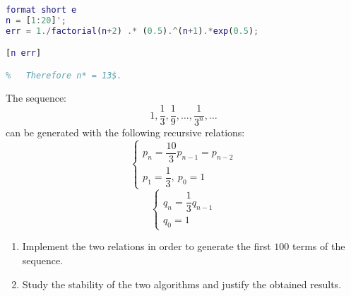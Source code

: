 \documentclass[12pt, a4paper]{report}
\newtheorem[style=M,bodystyle=\normalfont]{theorem}{Theorem}
\newtheorem[style=M,bodystyle=\normalfont]{corollary}{Corollary}
\newtheorem[style=M,bodystyle=\normalfont]{lemma}{Lemma}
\newtheorem[style=M,bodystyle=\normalfont]{definition}{Definition}
\begin{document}
\begin{Answer}[ref=7]
\begin{lstlisting}[language=Matlab]
format short e
n = [1:20]';
err = 1./factorial(n+2) .* (0.5).^(n+1).*exp(0.5);

[n err]

%   Therefore n* = 13$.            
        \end{lstlisting}
    \end{Answer}

    \newpage

    \begin{Exercise}[label=8]
        The sequence: 
        \[1, \dfrac{1}{3}, \dfrac{1}{9}, \dots, \dfrac{1}{3^n},\dots\]
        can be generated with the following recursive relations: 
        \[
        \begin{cases}
            p_n=\dfrac{10}{3}p_{n-1}=p_{n-2}  \\
            p_1 = \dfrac{1}{3}, \: p_0=1
        \end{cases}
        \]
        \[
        \begin{cases}
            q_n=\dfrac{1}{3}q_{n-1}  \\
            q_0=1
        \end{cases}
        \]
        \begin{enumerate}
            \item Implement the two relations in order to generate the first $100$ terms of the sequence.
            \item Study the stability of the two algorithms and justify the obtained results. 
        \end{enumerate}
    \end{Exercise}
\end{document}
